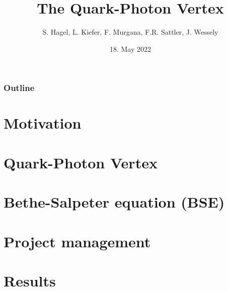 \documentclass[pt12]{beamer}
\title[ECT* DTP 2022]{The Quark-Photon Vertex}
\author{S. Hagel, L. Kiefer, F. Murgana, F.R. Sattler, J. Wessely}
\date{18. May 2022}
\begin{document}
  \begin{frame}[plain]
    \titlepage
  \end{frame}

  \begin{frame}[label=outline]\frametitle{Outline}
    \tableofcontents
  \end{frame}

  \section{Motivation}\label{sec:1}
  


  \section{Quark-Photon Vertex}\label{sec:2}
    

  \section{Bethe-Salpeter equation (BSE)}\label{sec:3}
    
    
    
    

  \section{Project management}\label{sec:4}
    

  \section{Results}\label{sec:5}
    
\end{document}
